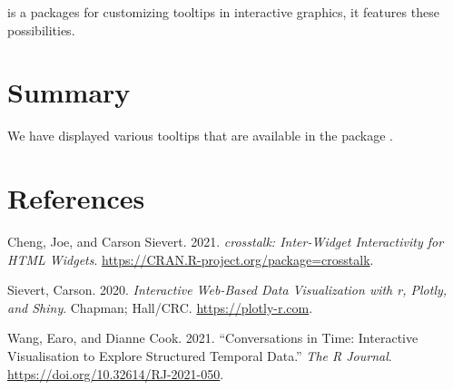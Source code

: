  is a packages for customizing tooltips in interactive graphics, it features these possibilities.

\hypertarget{summary}{%
\section{Summary}\label{summary}}

We have displayed various tooltips that are available in the package .

\hypertarget{references}{%
\section*{References}\label{references}}

\hypertarget{refs}{}
\begin{CSLReferences}{1}{0}
\leavevmode{}%
Cheng, Joe, and Carson Sievert. 2021. \emph{{crosstalk}: Inter-Widget Interactivity for HTML Widgets}. \url{https://CRAN.R-project.org/package=crosstalk}.

\leavevmode{}%
Sievert, Carson. 2020. \emph{{Interactive Web-Based Data Visualizatio}n with r, Plotly, and Shiny}. Chapman; Hall/CRC. \url{https://plotly-r.com}.

\leavevmode{}%
Wang, Earo, and Dianne Cook. 2021. {``Conversations in Time: Interactive Visualisation to Explore Structured Temporal Data.''} \emph{The R Journal}. \url{https://doi.org/10.32614/RJ-2021-050}.

\end{CSLReferences}



\address{%
Jordan A. Awan\\
Purdue University\\%
Department of Statistics\\ West Lafayette, IN 47907\\
%
\url{https://www.britannica.com/animal/quokka}\\%
%
\href{mailto:jawan@purdue.edu}{\nolinkurl{jawan@purdue.edu}}%
}

\address{%
Kevin Eng\\
Rutgers University\\%
Department of Statistics\\ Piscataway, NJ 08854\\
%
\url{https://www.britannica.com/animal/quokka}\\%
%
\href{mailto:ke157@stat.rutgers.edu}{\nolinkurl{ke157@stat.rutgers.edu}}%
}

